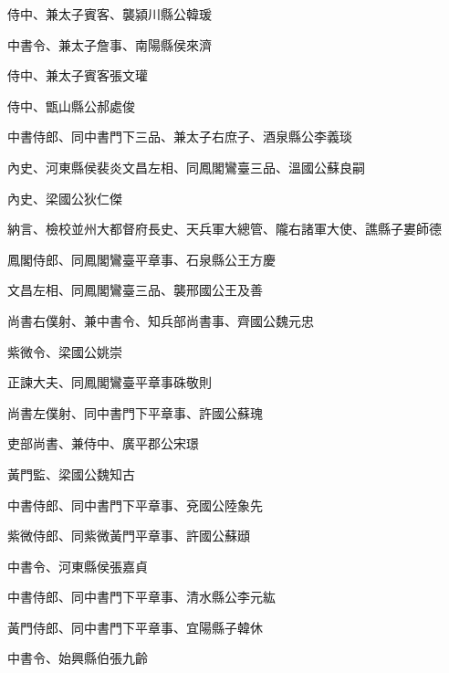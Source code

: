 \begin{pinyinscope}
 侍中、兼太子賓客、襲潁川縣公韓瑗



 中書令、兼太子詹事、南陽縣侯來濟



 侍中、兼太子賓客張文瓘



 侍中、甑山縣公郝處俊



 中書侍郎、同中書門下三品、兼太子右庶子、酒泉縣公李義琰



 內史、河東縣侯裴炎文昌左相、同鳳閣鸞臺三品、溫國公蘇良嗣



 內史、梁國公狄仁傑



 納言、檢校並州大都督府長史、天兵軍大總管、隴右諸軍大使、譙縣子婁師德



 鳳閣侍郎、同鳳閣鸞臺平章事、石泉縣公王方慶



 文昌左相、同鳳閣鸞臺三品、襲邢國公王及善



 尚書右僕射、兼中書令、知兵部尚書事、齊國公魏元忠



 紫微令、梁國公姚崇



 正諫大夫、同鳳閣鸞臺平章事硃敬則



 尚書左僕射、同中書門下平章事、許國公蘇瑰



 吏部尚書、兼侍中、廣平郡公宋璟



 黃門監、梁國公魏知古



 中書侍郎、同中書門下平章事、兗國公陸象先



 紫微侍郎、同紫微黃門平章事、許國公蘇頲



 中書令、河東縣侯張嘉貞



 中書侍郎、同中書門下平章事、清水縣公李元紘



 黃門侍郎、同中書門下平章事、宜陽縣子韓休



 中書令、始興縣伯張九齡




\end{pinyinscope}
